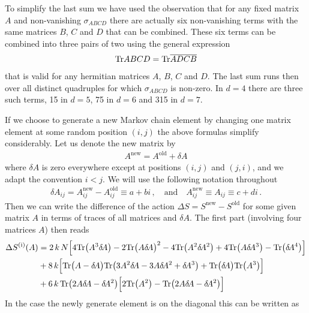 \documentclass[10pt,a4paper]{article}
\newcommand{\RN}[1]{%
    \textup{\uppercase\expandafter{\romannumeral#1}}%
}
\newcommand{\Tr}{\mathrm{Tr}\vspace{-2pt}}
\newcommand{\deltaA}{\delta \! A}
\begin{document}
To simplify the last sum we have used the observation that for
any fixed matrix $A$ and non-vanishing $\sigma_{ABCD}$ there are
actually six non-vanishing terms with the same matrices $B$, $C$
and $D$ that can be combined. These six terms can be combined into
three pairs of two using the general expression
\begin{align}
  \Tr ABCD = \Tr \overline{ADCB}
\end{align}
that is valid for any hermitian matrices $A$, $B$, $C$ and $D$.
The last sum runs then over all distinct quadruples for which
$\sigma_{ABCD}$ is non-zero.
In $d=4$ there are three such terms, 15 in $d=5$, 75 in $d=6$
and 315 in $d=7$.

\newpage

If we choose to generate a new Markov chain element by changing one
matrix element at some random position $(i,j)$ the above formulas simplify considerably.
Let us denote the new matrix by
\begin{align}
  A^{\mathrm{new}} = A^{\mathrm{old}} + \deltaA
\end{align}
where $\deltaA$ is zero everywhere except at positions $(i,j)$ and
$(j,i)$, and we adapt the convention $i<j$.
We will use the following notation throughout
\begin{align}
  \deltaA_{ij} = A_{ij}^{\mathrm{new}} - A_{ij}^{\mathrm{old}} \equiv a + bi \,,
  \quad \text{and} \quad
  A^{\mathrm{new}}_{ij} \equiv A_{ij} \equiv c + di \,.
\end{align}
Then we can write the difference of the action $\Delta S = S^{\mathrm{new}}
- S^{\mathrm{old}}$ for some given matrix $A$ in terms of traces of
all matrices and $\deltaA$.
The first part (involving four matrices $A$) then reads
\begin{align}
  \Delta S^{(\RN 1)} (A) &=
  2 \, k \, N
  \Big[
      4 \Tr \big( A^3 \deltaA   \big)
    - 2 \Tr \big( A   \deltaA   \big)^2
    - 4 \Tr \big( A^2 \deltaA^2 \big)
    + 4 \Tr \big( A   \deltaA^3 \big)
    -   \Tr \big(     \deltaA^4 \big)
  \Big]
  \nonumber \\
  &+ 8 \, k
  \Big[
    \Tr \big( A - \deltaA \big) \Tr \big( 3 A^2 \deltaA - 3 A \deltaA^2 + \deltaA^3 \big)
    + \Tr \big( \deltaA \big) \Tr \big( A^3 \big)
  \Big]
  \nonumber \\
  &+ 6  \, k  \, \Tr \big( 2 A \deltaA - \deltaA^2 \big)
  \Big[
    2 \Tr \big( A^2 \big)
    - \Tr \big( 2 A \deltaA - \deltaA^2 \big)
  \Big]
\end{align}
In the case the newly generate element is on the diagonal this can be written as
\end{document}
